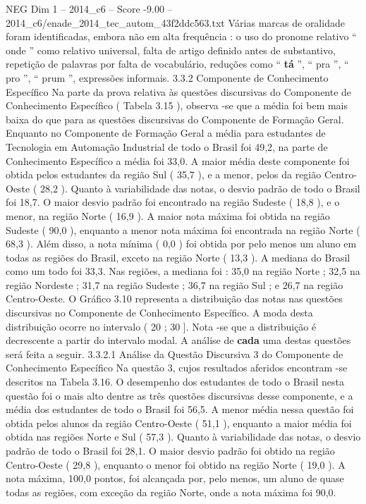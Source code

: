 \begin{textsample}{NEG Dim 1 – 2014\_c6 – Score -9.00 – 2014\_c6/enade\_2014\_tec\_autom\_43f2ddc563.txt}
Várias marcas de oralidade foram identificadas, embora não em alta frequência : o uso do pronome relativo “ onde ” como relativo universal, falta de artigo definido antes de substantivo, repetição de palavras por falta de vocabulário, reduções como “ \textbf{tá} ”, “ pra ”, “ pro ”, “ prum ”, expressões informais. 3.3.2 Componente de Conhecimento Específico Na parte da prova relativa às questões discursivas do Componente de Conhecimento Específico ( Tabela 3.15 ), observa -se que a média foi bem mais baixa do que para as questões discursivas do Componente de Formação Geral.
Enquanto no Componente de Formação Geral a média para estudantes de Tecnologia em Automação Industrial de todo o Brasil foi 49,2, na parte de Conhecimento Específico a média foi 33,0.
A maior média deste componente foi obtida pelos estudantes da região Sul ( 35,7 ), e a menor, pelos da região Centro-Oeste ( 28,2 ).
Quanto à variabilidade das notas, o desvio padrão de todo o Brasil foi 18,7.
O maior desvio padrão foi encontrado na região Sudeste ( 18,8 ), e o menor, na região Norte ( 16,9 ).
A maior nota máxima foi obtida na região Sudeste ( 90,0 ), enquanto a menor nota máxima foi encontrada na região Norte ( 68,3 ).
Além disso, a nota mínima ( 0,0 ) foi obtida por pelo menos um aluno em todas as regiões do Brasil, exceto na região Norte ( 13,3 ).
A mediana do Brasil como um todo foi 33,3.
Nas regiões, a mediana foi : 35,0 na região Norte ; 32,5 na região Nordeste ; 31,7 na região Sudeste ; 36,7 na região Sul ; e 26,7 na região Centro-Oeste.
O Gráfico 3.10 representa a distribuição das notas nas questões discursivas no Componente de Conhecimento Específico.
A moda desta distribuição ocorre no intervalo ( 20 ; 30 ].
Nota -se que a distribuição é decrescente a partir do intervalo modal.
A análise de \textbf{cada} uma destas questões será feita a seguir. 3.3.2.1 Análise da Questão Discursiva 3 do Componente de Conhecimento Específico Na questão 3, cujos resultados aferidos encontram -se descritos na Tabela 3.16.
O desempenho dos estudantes de todo o Brasil nesta questão foi o mais alto dentre as três questões discursivas desse componente, e a média dos estudantes de todo o Brasil foi 56,5.
A menor média nessa questão foi obtida pelos alunos da região Centro-Oeste ( 51,1 ), enquanto a maior média foi obtida nas regiões Norte e Sul ( 57,3 ).
Quanto à variabilidade das notas, o desvio padrão de todo o Brasil foi 28,1.
O maior desvio padrão foi obtido na região Centro-Oeste ( 29,8 ), enquanto o menor foi obtido na região Norte ( 19,0 ).
A nota máxima, 100,0 pontos, foi alcançada por, pelo menos, um aluno de quase todas as regiões, com exceção da região Norte, onde a nota máxima foi 90,0.

\end{textsample}
